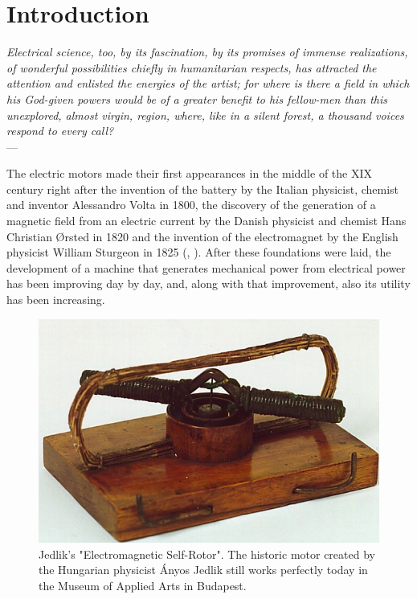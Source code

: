 \chapter{Introduction} \label{chap:intro}

\begin{flushright}{\slshape    
Electrical science, too, by its fascination, by its promises of immense realizations, of wonderful possibilities chiefly in humanitarian respects, has attracted the attention and enlisted the energies of the artist; for where is there a field in which his God-given powers would be of a greater benefit to his fellow-men than this unexplored, almost virgin, region, where, like in a silent forest, a thousand voices respond to every call?}
   \\ \medskip --- \citeauthor{on_electricity:1897}
    \citeyear{on_electricity:1897}
\end{flushright} 

The electric motors made their first appearances in the middle of the XIX century right after the invention of the battery by the Italian physicist, chemist and inventor Alessandro Volta in 1800, the discovery of the generation of a magnetic field from an electric current by the Danish physicist and chemist Hans Christian \O rsted in 1820 and the invention of the electromagnet by the English physicist William Sturgeon in 1825 (\citeauthor{ETI_motorHistory}, \citeyear{ETI_motorHistory}). After these foundations were laid, the development of a machine that generates mechanical power from electrical power has been improving day by day, and, along with that improvement, also its utility has been increasing.

\begin{figure}[htbp]
\centering
\includegraphics[width=\columnwidth]{Images/jedlik_motor.png} 
\caption[Jedlik's "Electromagnetic Self-Rotor"]{Jedlik's "Electromagnetic Self-Rotor". The historic motor created by the Hungarian physicist \'Anyos Jedlik still works perfectly today in the Museum of Applied Arts in Budapest.}
\label{fig:jedlik_motor}
\end{figure}

